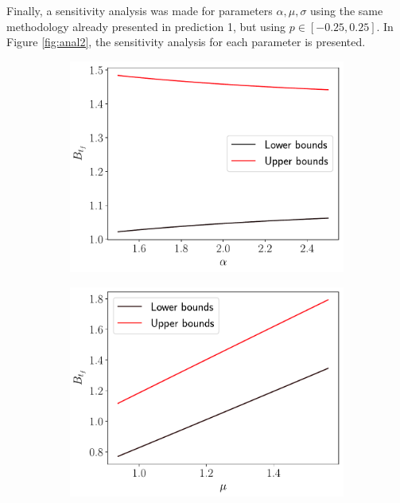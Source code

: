 \documentclass[11pt]{article}
\theoremstyle{definition}
\theoremstyle{remark}
\theoremstyle{remark}
\begin{document}
Finally, a sensitivity analysis was made for parameters
$\alpha, \mu, \sigma$ using the same methodology already presented in
prediction 1, but using $p \in [-0.25, 0.25]$. In Figure \ref{fig:anal2},
the sensitivity analysis for each parameter is presented.

\begin{figure}[H]
  \centering
  \begin{subfigure}[b]{0.45\textwidth}
      \centering
      \includegraphics[scale=0.45]{alpha_sens}
      \caption{}
  \end{subfigure}
  \begin{subfigure}[b]{0.45\textwidth}
      \centering
      \includegraphics[scale=0.45]{mu_sens}

\end{subfigure}
\end{figure}
\end{document}
